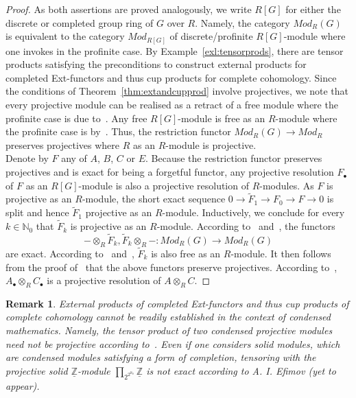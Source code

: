 \documentclass[12pt, a4paper]{article}
\numberwithin{equation}{section}
\newtheorem{rem}[thm]{Remark}
\theoremstyle{empty}
\theoremstyle{nonumberplain}
\newtheorem{proof}{Proof}
\begin{document}
\begin{proof}
As both assertions are proved analogously, we write $R[G]$ for either the discrete or completed group ring of $G$ over $R$. Namely, the category $Mod_R(G)$ is equivalent to the category $Mod_{R[G]}$ of discrete/profinite $R[G]$-module where one invokes \cite[Proposition~5.3.6]{rib10} in the profinite case. By Example~\ref{exl:tensorprods}, there are tensor products satisfying the preconditions to construct external products for completed Ext-functors and thus cup products for complete cohomology. Since the conditions of Theorem~\ref{thm:extandcupprod} involve projectives, we note that every projective module can be realised as a retract of a free module where the profinite case is due to~\cite[Proposition~5.4.2]{rib10}. Any free $R[G]$-module is free as an $R$-module where the profinite case is by~\cite[Corollary~5.7.2]{rib10}. Thus, the restriction functor $Mod_R(G) \rightarrow Mod_R$ preserves projectives where $R$ as an $R$-module is projective. \\

Denote by $F$ any of $A$, $B$, $C$ or $E$. Because the restriction functor preserves projectives and is exact for being a forgetful functor, any projective resolution $F_{\bullet}$ of $F$ as an $R[G]$-module  is also a projective resolution of $R$-modules. As $F$ is projective as an $R$-module, the short exact sequence $0 \rightarrow \widetilde{F}_1 \rightarrow F_0 \rightarrow F \rightarrow 0$ is split and hence $\widetilde{F}_1$ projective as an $R$-module. Inductively, we conclude for every $k \in \mathbb{N}_0$ that $\widetilde{F}_k$ is projective as an $R$-module. According to~\cite[p.~29]{bro82} and~\cite[Proposition~5.5.3]{rib10}, the functors
\[ - \otimes_R \widetilde{F}_k, \widetilde{F}_k \otimes_R -: Mod_R(G) \rightarrow Mod_R(G) \]
are exact. According to~\cite[Theorem~9.8]{rot02} and~\cite[Proposition~7.5.1]{wil98}, $\widetilde{F}_k$ is also free as an $R$-module. It then follows from the proof of~\cite[Proposition~3.3.2]{sym00} that the above functors preserve projectives. According to~\cite[Lemma~10.4.4]{wil98}, $A_{\bullet} \otimes_R C_{\bullet}$ is a projective resolution of $A \otimes_R C$.
\end{proof}

\begin{rem}
External products of completed Ext-functors and thus cup products of complete cohomology cannot be readily established in the context of condensed mathematics. Namely, the tensor product of two condensed projective modules need not be projective according to~\cite[Proposition~3.7]{sch22}. Even if one considers solid modules, which are condensed modules satisfying a form of completion, tensoring with the projective solid $\underline{\mathbb{Z}}$-module $\prod_{2^{2^{\aleph_0}}} \underline{\mathbb{Z}}$ is not exact according to A.\! I.\! Efimov (yet to appear).
\end{rem}
\end{document}
